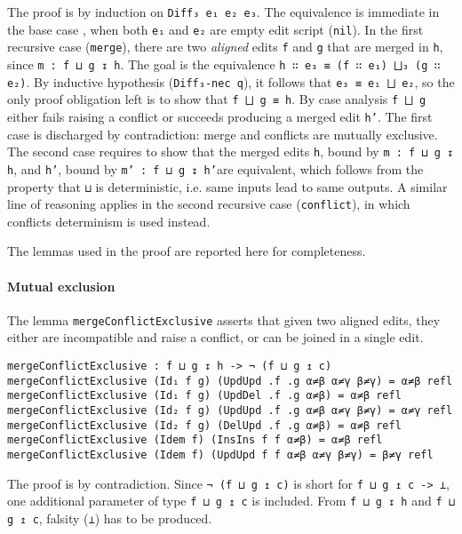 \documentclass[../Thesis.tex]{subfiles}
\begin{document}
	The proof is by induction on \texttt{Diff₃ e₁ e₂ e₃}.
	The equivalence is immediate in the base case	, when both
	\texttt{e₁} and \texttt{e₂} are empty edit script (\texttt{nil}).
	In the first recursive case (\texttt{merge}), there are 
	two \emph{aligned} edits \texttt{f} and \texttt{g} that are
	merged in \texttt{h}, since \texttt{m : f ⊔ g ↧ h}.
	The goal is the equivalence \texttt{h ∷ e₃ ≡ (f ∷ e₁) ⨆₃ (g ∷ e₂)}. By inductive 
	hypothesis (\texttt{Diff₃-nec q}), it follows that \texttt{e₃ ≡ e₁ ⨆ e₂}, so
	the only proof obligation left is to show that \texttt{f ⨆ g ≡ h}.
	By case analysis \texttt{f ⨆ g} either fails raising a conflict or succeeds
	producing a merged edit \texttt{h'}.
	The first case is discharged by contradiction: merge and conflicts
	are mutually exclusive.
	The second case requires to show that the merged edits \texttt{h},
	bound by \texttt{m : f ⊔ g ↧ h}, and \texttt{h'}, bound by 
	\texttt{m' : f ⊔ g ↧ h'}are equivalent, which follows from the property that 
	\texttt{⊔} is deterministic, i.e. same inputs lead to same outputs.
	A similar line of reasoning applies in the second recursive
	case (\texttt{conflict}), in which conflicts determinism
	is used instead.
	
	The lemmas used in the proof are reported here for completeness.

	\paragraph{Mutual exclusion}
	The lemma \texttt{mergeConflictExclusive} asserts that given
	two aligned edits, they either are incompatible and raise a conflict, or
	can be joined in a single edit. 

	\begin{verbatim}
mergeConflictExclusive : f ⊔ g ↧ h -> ¬ (f ⊔ g ↥ c)
mergeConflictExclusive (Id₁ f g) (UpdUpd .f .g α≠β α≠γ β≠γ) = α≠β refl
mergeConflictExclusive (Id₁ f g) (UpdDel .f .g α≠β) = α≠β refl
mergeConflictExclusive (Id₂ f g) (UpdUpd .f .g α≠β α≠γ β≠γ) = α≠γ refl
mergeConflictExclusive (Id₂ f g) (DelUpd .f .g α≠β) = α≠β refl
mergeConflictExclusive (Idem f) (InsIns f f α≠β) = α≠β refl
mergeConflictExclusive (Idem f) (UpdUpd f f α≠β α≠γ β≠γ) = β≠γ refl
	\end{verbatim}
	
	The proof is by contradiction.
	Since \texttt{¬ (f ⊔ g ↥ c)} is short for \texttt{f ⊔ g ↥ c -> ⊥},
	one additional parameter of type \texttt{f ⊔ g ↥ c} is included.
	From \texttt{f ⊔ g ↧ h} and \texttt{f ⊔ g ↥ c}, falsity (\texttt{⊥})
	has to be produced. 
	
\end{document}
